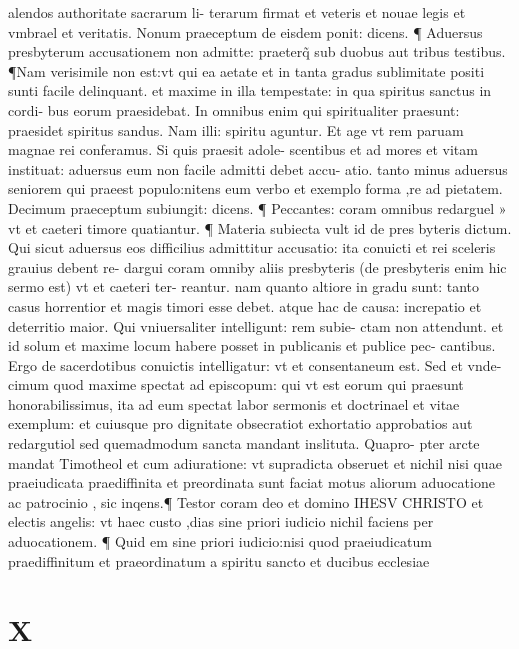 \documentclass{article}
\begin{document}
\begin{pages}
alendos authoritate sacrarum li- terarum firmat et veteris et nouae legis et vmbrael et veritatis. Nonum praeceptum de eisdem ponit: dicens. ¶ Aduersus presbyterum accusationem non admitte: praeterq̃ sub duobus aut tribus testibus. ¶Nam verisimile non est:vt qui ea aetate et in tanta gradus sublimitate positi sunti facile delinquant. et maxime in illa tempestate: in qua spiritus sanctus in cordi- bus eorum praesidebat. In omnibus enim qui spiritualiter praesunt: praesidet spiritus sandus. Nam illi: spiritu aguntur. Et age vt rem paruam magnae rei conferamus. Si quis praesit adole- scentibus et ad mores et vitam instituat: aduersus eum non facile admitti debet accu- atio. tanto minus aduersus seniorem qui praeest populo:nitens eum verbo et exemplo forma ,re ad pietatem. Decimum praeceptum subiungit: dicens. ¶ Peccantes: coram omnibus redarguel » vt et caeteri timore quatiantur. ¶ Materia subiecta vult id de pres byteris dictum. Qui sicut aduersus eos difficilius admittitur accusatio: ita conuicti et rei sceleris grauius debent re- dargui coram omniby aliis presbyteris (de presbyteris enim hic sermo est) vt et caeteri ter- reantur. nam quanto altiore in gradu sunt: tanto casus horrentior et magis timori esse debet. atque hac de causa: increpatio et deterritio maior. Qui vniuersaliter intelligunt: rem subie- ctam non attendunt. et id solum et maxime locum habere posset in publicanis et publice pec- cantibus. Ergo de sacerdotibus conuictis intelligatur: vt et consentaneum est. Sed et vnde- cimum quod maxime spectat ad episcopum: qui vt est eorum qui praesunt honorabilissimus, ita ad eum spectat labor sermonis et doctrinael et vitae exemplum: et cuiusque pro dignitate obsecratiot exhortatio approbatios aut redargutiol sed quemadmodum sancta mandant inslituta. Quapro- pter arcte mandat Timotheol et cum adiuratione: vt supradicta obseruet et nichil nisi quae praeiudicata praediffinita et preordinata sunt faciat motus aliorum aduocatione ac patrocinio , sic inqens.¶ Testor coram deo et domino IHESV CHRISTO et electis angelis: vt haec custo ,dias sine priori iudicio nichil faciens per aduocationem. ¶ Quid em sine priori iudicio:nisi quod praeiudicatum praediffinitum et praeordinatum a spiritu sancto et ducibus ecclesiae  \pend
\section*{X }

\end{pages}
\end{document}

